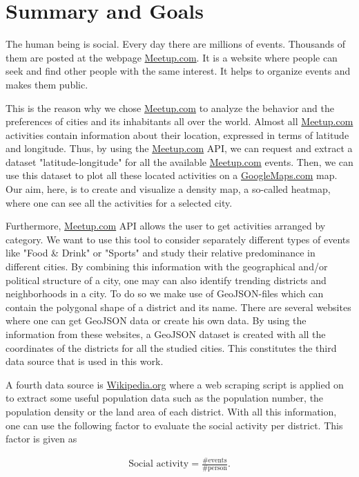 \section{Summary and Goals}\label{sec:summaryandgoals}

The human being is social. Every day there are millions of events. Thousands of them are posted at the webpage \url{Meetup.com}. It is a website where people can seek and find other people with the same interest. It helps to organize events and makes them public.

This is the reason why we chose \url{Meetup.com} to analyze the behavior and the preferences of cities and its inhabitants all over the world. Almost all \url{Meetup.com} activities contain information about their location, expressed in terms of latitude and longitude. Thus, by using the \url{Meetup.com} API, we can request and extract a dataset "latitude-longitude" for all the available \url{Meetup.com} events. Then, we can use this dataset to plot all these located activities on a \url{GoogleMaps.com} map. Our aim, here, is to create and visualize a density map, a so-called heatmap, where one can see all the activities for a selected city.

Furthermore, \url{Meetup.com} API allows the user to get activities arranged by category. We want to use this tool to consider separately different types of events like "Food \& Drink" or "Sports" and study their relative predominance in different cities. By combining this information with the geographical and/or political structure of a city, one may can also identify trending districts and neighborhoods in a city. To do so we make use of GeoJSON-files which can contain the polygonal shape of a district and its name. There are several websites where one can get GeoJSON data or create his own data. By using the information from these websites, a GeoJSON dataset is created with all the coordinates of the districts for all the studied cities. This constitutes the third data source that is used in this work.

A fourth data source is \url{Wikipedia.org} where a web scraping script is applied on to extract some useful population data such as the population number, the population density or the land area of each district. With all this information, one can use the following factor to evaluate the social activity per district. This factor is given as

\begin{align*}
	\text{Social activity} = \frac{\text{\# events}}{\text{\# person}}.
\end{align*}

